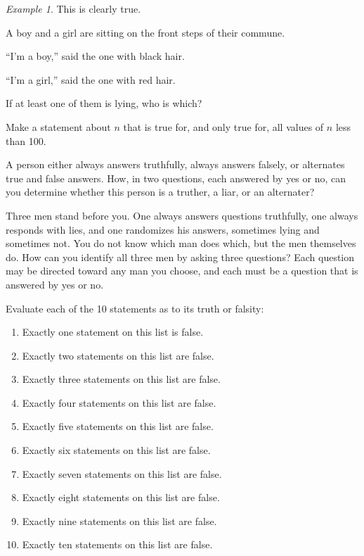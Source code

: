 \documentclass[11pt]{exam}
\theoremstyle{remark}
\newtheorem{example}[thm]{Example}
\numberwithin{equation}{section}
\begin{document}
\begin{questions}
\begin{example}
This is clearly true.

\end{example}

\newpage

\question A boy and a girl are sitting on the front steps of their commune. 

``I'm a boy,'' said the one with black hair. 

``I'm a girl,'' said the one with red hair. 

If at least one of them is lying, who is which? 

\newpage

\question Make a statement about $n$ that is true for, and only true for, all values of $n$ less than 100.

\newpage

\question A person either always answers truthfully, always answers falsely, 
or alternates true and false answers. How, in two questions, each 
answered by yes or no, can you determine whether this person is a truther, a 
liar, or an alternater? 

\newpage


\question Three men stand before you. One always answers questions truthfully, one always responds with lies, and one randomizes his answers, 
sometimes lying and sometimes not. You do not know which man 
does which, but the men themselves do. How can you identify all 
three men by asking three questions? Each question may be directed 
toward any man you choose, and each must be a question that is 
answered by yes or no.

\newpage

\question Evaluate each of the 10 statements as to its truth or falsity: 

\begin{enumerate}
    \item Exactly one statement on this list is false. 
    \item Exactly two statements on this list are false. 
    \item Exactly three statements on this list are false. 
    \item Exactly four statements on this list are false. 
    \item Exactly five statements on this list are false. 
    \item Exactly six statements on this list are false. 
    \item Exactly seven statements on this list are false. 
    \item Exactly eight statements on this list are false. 
    \item Exactly nine statements on this list are false.
    \item Exactly ten statements on this list are false. 
\end{enumerate}


\end{questions}
\end{document}
